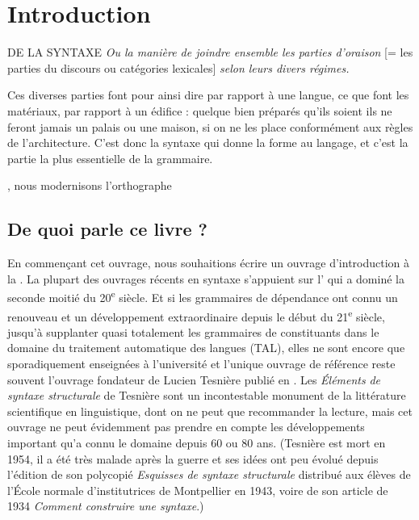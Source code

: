 \chapter{Introduction}

\epigraph{DE LA SYNTAXE \textit{Ou la manière de joindre ensemble les parties d’oraison} [= les parties du discours ou catégories lexicales] \textit{selon leurs divers régimes.}

Ces diverses parties font pour ainsi dire par rapport à une langue, ce que font les matériaux, par rapport à un édifice : quelque bien préparés qu’ils soient ils ne feront jamais un palais ou une maison, si on ne les place conformément aux règles de l’architecture. C’est donc la syntaxe qui donne la forme au langage, et c’est la partie la plus essentielle de la grammaire.}{\citealt[294]{buffier1709grammaire}, nous modernisons l’orthographe}

\section{De quoi parle ce livre ?}\label{sec:0.0.0}

En commençant cet ouvrage, nous souhaitions écrire un ouvrage d’introduction à la . La plupart des ouvrages récents en syntaxe s’appuient sur l’ qui a dominé la seconde moitié du 20\textsuperscript{e} siècle. Et si les grammaires de dépendance ont connu un renouveau et un développement extraordinaire depuis le début du 21\textsuperscript{e} siècle, jusqu’à supplanter quasi totalement les grammaires de constituants dans le domaine du traitement automatique des langues (TAL), elles ne sont encore que sporadiquement enseignées à l’université et l’unique ouvrage de référence reste souvent l’ouvrage fondateur de Lucien Tesnière publié en \citeyear{tesniere1959elements}. Les \textit{Éléments} \textit{de syntaxe structurale} de Tesnière sont un incontestable monument de la littérature scientifique en linguistique, dont on ne peut que recommander la lecture, mais cet ouvrage ne peut évidemment pas prendre en compte les développements important qu’a connu le domaine depuis 60 ou 80 ans. (Tesnière est mort en 1954, il a été très malade après la guerre et ses idées ont peu évolué depuis l’édition de son polycopié \textit{Esquisses de syntaxe structurale} distribué aux élèves de l’École normale d’institutrices de Montpellier en 1943, voire de son article de 1934 \textit{Comment construire une syntaxe}.)

